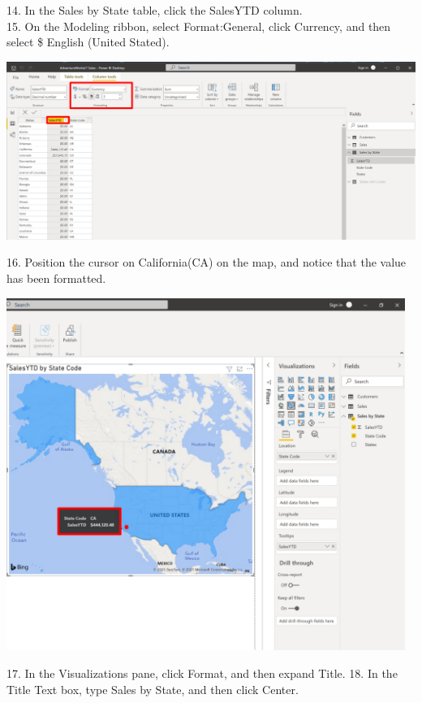 \documentclass[12pt,letterpaper]{article}
\begin{document}
14. In the Sales by State table, click the SalesYTD column.
\\15. On the Modeling ribbon, select Format:General, click Currency, and then select \$ English (United
Stated).
\begin{center}
    \includegraphics[width=17cm]{img/110.png}
    \vspace{1cm}
\end{center}
16. Position the cursor on California(CA) on the map, and notice that the value has been formatted.
\begin{center}
    \includegraphics[width=13cm]{img/111.png}
\end{center}
17. In the Visualizations pane, click Format, and then expand Title.
18. In the Title Text box, type Sales by State, and then click Center.
\end{document}
